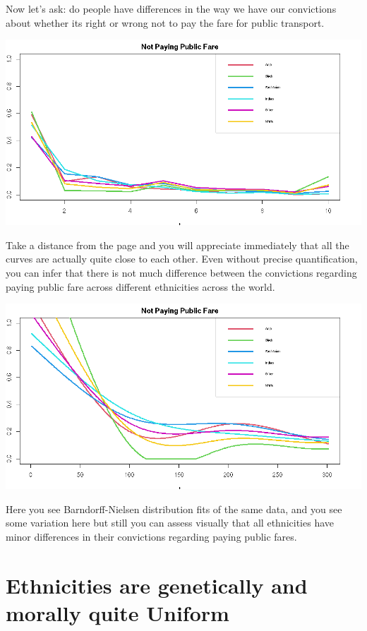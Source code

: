 \documentclass{amsart}
\begin{document}
Now let's ask:  do people have differences in the way we have our convictions about whether its right or wrong not to pay the fare for public transport.


\includegraphics[scale=0.4]{public_fare.png}

Take a distance from the page and you will appreciate immediately that all the curves are actually quite close to each other.  Even without precise quantification, you can infer that there is not much difference between the convictions regarding paying public fare across different ethnicities across the world.

\includegraphics[scale=0.4]{public_fare_ghd.png}

Here you see Barndorff-Nielsen distribution fits of the same data, and you see some variation here but still you can assess visually that all ethnicities have minor differences in their convictions regarding paying public fares.

\section{Ethnicities are genetically and morally quite Uniform}
\end{document}
